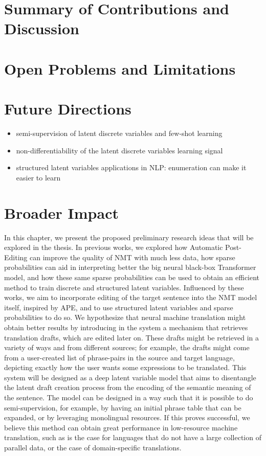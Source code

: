 \label{cap:conclusions}

\doublespacing

\section{Summary of Contributions and Discussion}

\section{Open Problems and Limitations}

\section{Future Directions}

\begin{itemize}
    \item semi-supervision of latent discrete variables and few-shot learning
    \item non-differentiability of the latent discrete variables learning signal
    \item structured latent variables applications in NLP: enumeration can make it easier to learn
\end{itemize}

\section{Broader Impact}

In this chapter, we present the proposed preliminary research ideas
that will be explored in the thesis. In previous works, we explored
how Automatic Post-Editing can improve the quality of NMT with much
less data, how sparse probabilities can aid in interpreting better
the big neural black-box Transformer model, and how these same sparse
probabilities can be used to obtain an efficient method to train
discrete and structured latent variables. Influenced by these works,
we aim to incorporate editing of the target sentence into the NMT
model itself, inspired by APE, and to use structured latent variables
and sparse probabilities to do so. We hypothesize that neural machine
translation might obtain better results by introducing in the system
a mechanism that retrieves translation drafts, which
are edited later on. These drafts might be retrieved in a variety of
ways and from different sources; for example, the drafts might come
from a user-created list of phrase-pairs in the source and target
language, depicting exactly how the user wants some expressions to be
translated. This system will be designed as a deep latent variable
model that aims to disentangle the latent draft creation process from
the encoding of the semantic meaning of the sentence. The model can
be designed in a way such that it is possible to do semi-supervision,
for example, by having an initial phrase table that can be expanded,
or by leveraging monolingual resources. If this proves successful, we
believe this method can obtain great performance in low-resource
machine translation, such as is the case for languages that do not
have a large collection of parallel data, or the case of
domain-specific translations.

